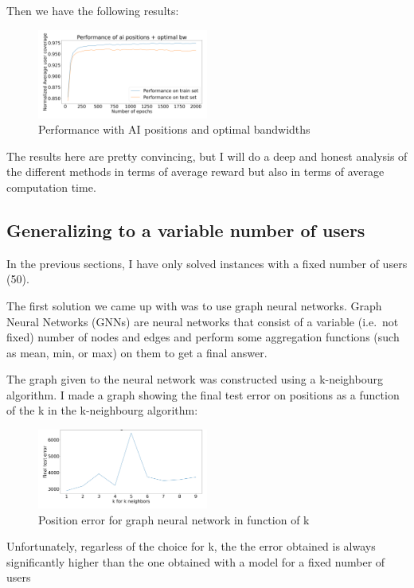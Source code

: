 \documentclass[letterpaper]{article}
\begin{document}
Then we have the following results:

\begin{figure}[H]
    \centering
    \includegraphics[width=0.5\textwidth]{images/mix_results.png}
    \caption{Performance with AI positions and optimal bandwidths}
\end{figure}

The results here are pretty convincing, but I will do a deep and honest analysis of the different methods in terms
of average reward but also in terms of average computation time.

\subsection{Generalizing to a variable number of users}

In the previous sections, I have only solved instances with a fixed number of users (50).

The first solution we came up with was to use graph neural networks.
Graph Neural Networks (GNNs) are neural networks that consist of a variable (i.e.\, not fixed) number
of nodes and edges and perform some aggregation functions (such as mean, min, or max) on them to get a final answer.

The graph given to the neural network was constructed using a k-neighbourg algorithm.
I made a graph showing the final test error on positions as a function of the k in the k-neighbourg algorithm:

\begin{figure}[H]
    \centering
    \includegraphics[width=0.5\textwidth]{images/knn_for_gnn.png}
    \caption{Position error for graph neural network in function of k}
\end{figure}

Unfortunately, regarless of the choice for k, the the error obtained is always significantly higher than the one obtained with a model for a fixed
number of users
\end{document}
